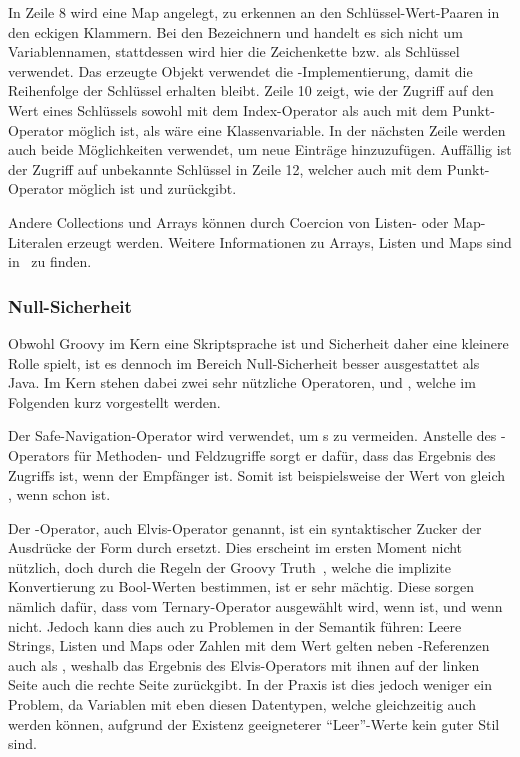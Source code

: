 	In Zeile 8 wird eine Map angelegt, zu erkennen an den Schlüssel-Wert-Paaren in den eckigen Klammern.
	Bei den Bezeichnern  und  handelt es sich nicht um Variablennamen, stattdessen wird hier die Zeichenkette  bzw.  als Schlüssel verwendet.
	Das erzeugte Objekt verwendet die -Implementierung, damit die Reihenfolge der Schlüssel erhalten bleibt.
	Zeile 10 zeigt, wie der Zugriff auf den Wert eines Schlüssels sowohl mit dem Index-Operator als auch mit dem Punkt-Operator möglich ist, als wäre  eine Klassenvariable.
	In der nächsten Zeile werden auch beide Möglichkeiten verwendet, um neue Einträge hinzuzufügen.
	Auffällig ist der Zugriff auf unbekannte Schlüssel in Zeile 12, welcher auch mit dem Punkt-Operator möglich ist und  zurückgibt.

	Andere Collections und Arrays können durch Coercion von Listen- oder Map-Literalen erzeugt werden.
	Weitere Informationen zu Arrays, Listen und Maps sind in~\cite[{Abs.} 7.-9.]{groovy-lang:syntax} zu finden.

	\subsubsection{Null-Sicherheit}

	Obwohl Groovy im Kern eine Skriptsprache ist und Sicherheit daher eine kleinere Rolle spielt, ist es dennoch im Bereich Null-Sicherheit besser ausgestattet als Java.
	Im Kern stehen dabei zwei sehr nützliche Operatoren,  und , welche im Folgenden kurz vorgestellt werden.

	Der Safe-Navigation-Operator  wird verwendet, um s zu vermeiden.
	Anstelle des -Operators für Methoden- und Feldzugriffe sorgt er dafür, dass das Ergebnis des Zugriffs  ist, wenn der Empfänger  ist.
	Somit ist beispielsweise der Wert von  gleich , wenn  schon  ist.

	Der -Operator, auch Elvis-Operator genannt, ist ein syntaktischer Zucker der Ausdrücke der Form  durch  ersetzt.
	Dies erscheint im ersten Moment nicht nützlich, doch durch die Regeln der Groovy Truth~\cite[{Abs.} 5.]{groovy-lang:semantics}, welche die implizite Konvertierung zu Bool-Werten bestimmen, ist er sehr mächtig.
	Diese sorgen nämlich dafür, dass  vom Ternary-Operator ausgewählt wird, wenn   ist, und  wenn nicht.
	Jedoch kann dies auch zu Problemen in der Semantik führen:
	Leere Strings, Listen und Maps oder Zahlen mit dem Wert  gelten neben -Referenzen auch als , weshalb das Ergebnis des Elvis-Operators mit ihnen auf der linken Seite auch die rechte Seite zurückgibt.
	In der Praxis ist dies jedoch weniger ein Problem, da Variablen mit eben diesen Datentypen, welche gleichzeitig auch  werden können, aufgrund der Existenz geeigneterer ``Leer''-Werte kein guter Stil sind.

